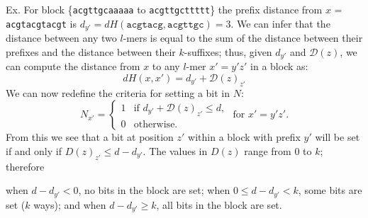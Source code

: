 \documentclass{acm_proc_article-sp}
\begin{document}
\begin{enumerate}
				{\small
					Ex. For block \{\texttt{acgttgcaaaaa} to \texttt{acgttgcttttt}\}\newline
					\hspace*{18pt} the prefix distance from $x$ = \texttt{acgtacgtacgt} is\newline
					\hspace*{21pt} $d_{y'} = dH(\texttt{acgtacg}, \texttt{acgttgc}) = 3$. } \newline\newline
			We can infer that the distance between any two $l$-mers is equal to the sum of the distance between their prefixes and the distance between their $k$-suffixes; thus, given $d_{y'}$ and $\mathcal{D}(z)$, we can compute the distance from $x$ to any $l$-mer $x' = y'z'$ in a block as:
			\begin{equation}
				dH(x,x') = d_{y'} + \mathcal{D}(z)_{z'}
				\end{equation}
			We can now redefine the criteria for setting a bit in $N$:
			\begin{equation*}
				N_{x'} = \left\{
				\begin{array}{rl}
					1 & \text{if } d_{y'} + \mathcal{D}(z)_{z'} \leq d,\\
					0 & \text{otherwise.}%
				\end{array} \right.
				\text{ for }x' = y'z'.
				\end{equation*}
			From this we see that a bit at position $z'$ within a block with prefix $y'$ will be set if and only if $D(z)_{z'} \leq d-d_{y'}$. The values in $D(z)$ range from 0 to $k$; therefore\newline

				{\small
					\hspace*{5pt} when $d-d_{y'} < 0$, 		\hspace*{24pt}no bits in the block are set;\newline
					\hspace*{5pt} when $0 \leq d-d_{y'} < k$,	\hspace*{6.5pt}some bits are set ($k$ ways); and\newline
					\hspace*{5pt} when $d-d_{y'} \geq k$, 		\hspace*{24pt}all bits in the block are set. \newline}
			

\end{enumerate}
\end{document}
